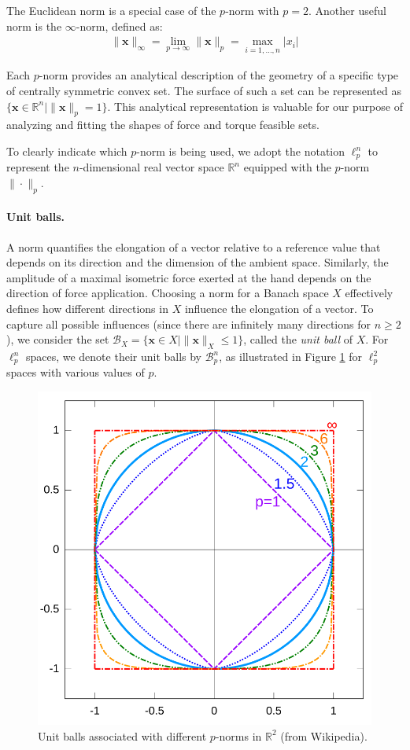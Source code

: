 The Euclidean norm is a special case of the $p$-norm with $p=2$.  Another useful norm is the $\infty$-norm, defined as:
\begin{align*}
\|\mathbf{x}\|_{\infty} = \lim_{p\to \infty} \|\mathbf{x}\|_p = \max_{i=1,\dots,n}\vert x_i\vert
\end{align*}

Each $p$-norm provides an analytical description of the geometry of a specific type of centrally symmetric convex set.  The surface of such a set can be represented as $\{\mathbf{x}\in \mathbb{R}^n \mid \|\mathbf{x}\|_p = 1\}$.  This analytical representation is valuable for our purpose of analyzing and fitting the shapes of force and torque feasible sets.

To clearly indicate which $p$-norm is being used, we adopt the notation $\ell_p^n$ to represent the $n$-dimensional real vector space $\mathbb{R}^n$ equipped with the $p$-norm $\|\cdot \|_p$.

\paragraph*{Unit balls.} A norm quantifies the elongation of a vector relative to a reference value that depends on its direction and the dimension of the ambient space. Similarly, the amplitude of a maximal isometric force exerted at the hand depends on the direction of force application. Choosing a norm for a Banach space $X$ effectively defines how different directions in $X$ influence the elongation of a vector. To capture all possible influences (since there are infinitely many directions for $n \geq 2$), we consider the set $\mathcal{B}_X = \{\mathbf{x}\in X \mid \|\mathbf{x}\|_X \leq 1 \}$, called the \emph{unit ball} of $X$.  For $\ell_p^n$ spaces, we denote their unit balls by $\mathcal{B}_p^n$, as illustrated in Figure \ref{fig:pnorms} for $\ell_p^2$ spaces with various values of $p$.

\begin{figure}[!htb]
  \captionsetup{justification=centering}
    \centering
    \includegraphics[trim={0 0 0 0}, clip, width=0.4\linewidth]{img/chapter_3/p_norms.png}
  \caption{Unit balls associated with different $p$-norms in $\mathbb{R}^2$ (from Wikipedia).}
  \label{fig:pnorms}
\end{figure}

